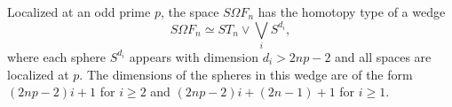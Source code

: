 Localized at an odd prime $p$, the space $S\Omega F_n$ has the homotopy type of a wedge
$$S\Omega F_n \simeq ST_n \vee \bigvee_{i} S^{d_i},$$
where each sphere $S^{d_i}$ appears with dimension $d_i > 2np-2$ and all spaces are localized at $p$. The dimensions of the spheres in this wedge are of the form $(2np-2)i + 1$ for $i \ge 2$ and $(2np-2)i + (2n-1) + 1$ for $i \ge 1$.
